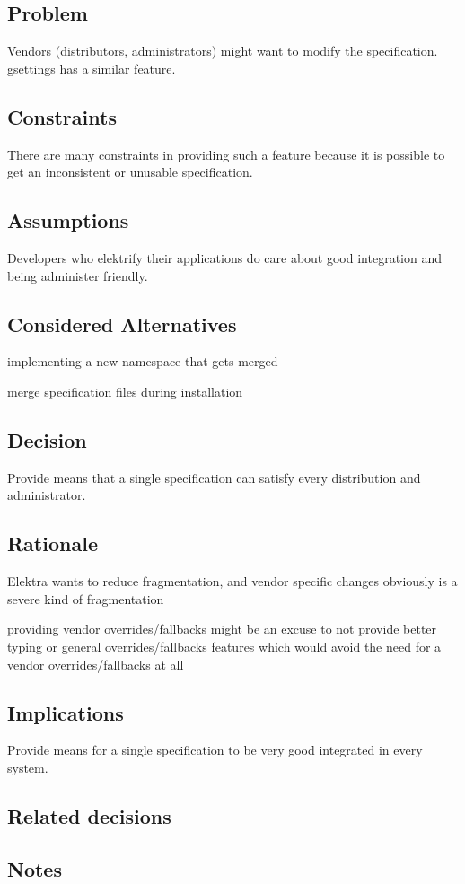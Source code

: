 \subsection*{Problem}

Vendors (distributors, administrators) might want to modify the specification. gsettings has a similar feature.

\subsection*{Constraints}

There are many constraints in providing such a feature because it is possible to get an inconsistent or unusable specification.

\subsection*{Assumptions}

Developers who elektrify their applications do care about good integration and being administer friendly.

\subsection*{Considered Alternatives}


\begin{DoxyItemize}
\item implementing a new namespace that gets merged
\item merge specification files during installation
\end{DoxyItemize}

\subsection*{Decision}

Provide means that a single specification can satisfy every distribution and administrator.

\subsection*{Rationale}


\begin{DoxyItemize}
\item Elektra wants to reduce fragmentation, and vendor specific changes obviously is a severe kind of fragmentation
\item providing vendor overrides/fallbacks might be an excuse to not provide better typing or general overrides/fallbacks features which would avoid the need for a vendor overrides/fallbacks at all
\end{DoxyItemize}

\subsection*{Implications}

Provide means for a single specification to be very good integrated in every system.

\subsection*{Related decisions}

\subsection*{Notes}